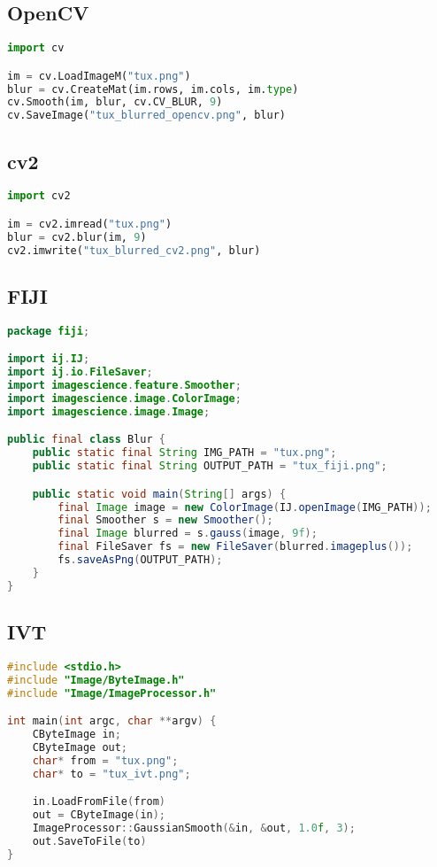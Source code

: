 \subsection{OpenCV}
\begin{lstlisting}[language=Python,
breaklines=true,
caption={Using OpenCV to blur an image},
label=lst:opencv, frame=single]
import cv

im = cv.LoadImageM("tux.png")
blur = cv.CreateMat(im.rows, im.cols, im.type)
cv.Smooth(im, blur, cv.CV_BLUR, 9)
cv.SaveImage("tux_blurred_opencv.png", blur)
\end{lstlisting}

\subsection{cv2}
\begin{lstlisting}[language=Python,
caption={Using cv2 to blur an image},
label=lst:cv2, frame=single]
import cv2

im = cv2.imread("tux.png")
blur = cv2.blur(im, 9)
cv2.imwrite("tux_blurred_cv2.png", blur)
\end{lstlisting}

\subsection{FIJI}
\begin{lstlisting}[language=Java,
breaklines=true,
caption={Using FIJI to blur an image},
label=lst:fiji, frame=single]
package fiji;

import ij.IJ;
import ij.io.FileSaver;
import imagescience.feature.Smoother;
import imagescience.image.ColorImage;
import imagescience.image.Image;

public final class Blur {
	public static final String IMG_PATH = "tux.png";
	public static final String OUTPUT_PATH = "tux_fiji.png";

	public static void main(String[] args) {
		final Image image = new ColorImage(IJ.openImage(IMG_PATH));
		final Smoother s = new Smoother();
		final Image blurred = s.gauss(image, 9f);
		final FileSaver fs = new FileSaver(blurred.imageplus());
		fs.saveAsPng(OUTPUT_PATH);
	}
}
\end{lstlisting}

\subsection{IVT}
\begin{lstlisting}[language=C++,
breaklines=true,
caption={Using IVT to blur an image},
label=lst:ivt, frame=single]
#include <stdio.h>
#include "Image/ByteImage.h"
#include "Image/ImageProcessor.h"

int main(int argc, char **argv) {
	CByteImage in;
	CByteImage out;
	char* from = "tux.png";
	char* to = "tux_ivt.png";

	in.LoadFromFile(from)
	out = CByteImage(in);
	ImageProcessor::GaussianSmooth(&in, &out, 1.0f, 3);
	out.SaveToFile(to)
}
\end{lstlisting}
